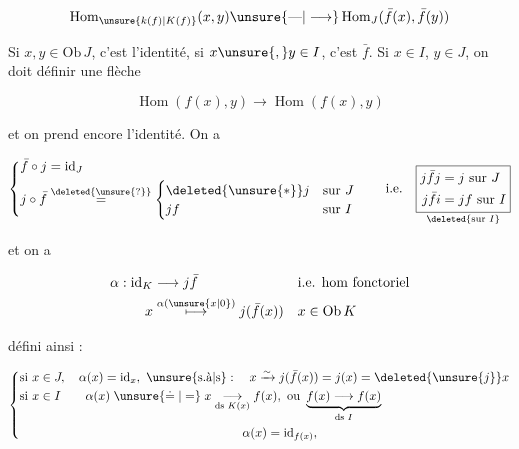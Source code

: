 \[
\operatorname{Hom}_{\unsure{k(f)|K(f)}}(x,y)\unsure{\text{---}|\longrightarrow}
\operatorname{Hom}_J(\bar f(x),\bar f(y))
\]

Si $x,y\in\mathrm{Ob}\,J$, c'est l'identité, si $x\unsure{,}y\in I$, c'est $\bar f$. Si $x\in I$, $y\in J$, on doit définir une flèche

\[
\operatorname{Hom}(f(x),y)\longrightarrow\operatorname{Hom}(f(x),y)
\]

et on prend encore l'identité.  On a


\[
\left\{\begin{aligned}
\bar f\circ j&=\mathrm{id}_J\\
j\circ\bar f&\overset{\deleted{\unsure{?}}}{=}
\begin{cases}\deleted{\unsure{*}}j&\text{sur }J\\jf&\text{sur }I\end{cases}
\end{aligned}\right.
\qquad\text{i.e.}\quad
\underset{\deleted{\text{sur }I}}{\boxed{\begin{aligned}
j\bar f j&=j\ \text{sur }J\\
j\bar f i&=jf\ \text{sur }I
\end{aligned}}}
\]

et on a 

\[
\begin{aligned}
\alpha:\mathrm{id}_K&\longrightarrow j\bar f&&\text{i.e. hom fonctoriel}\\
x&\overset{\alpha(\unsure{x|0})}{\longmapsto}j(\bar f(x))&&x\in\mathrm{Ob}\,K
\end{aligned}
\]

défini ainsi :

\[
\left\{\begin{aligned}
&\text{si }x\in J,\quad\alpha(x)=\mathrm{id}_x,\ \text{\unsure{s.à|s}}:\quad
 x\xrightarrow{\sim}j(\bar f(x))=j(x)=\deleted{\unsure{j}}x\\
&\text{si }x\in I\qquad\alpha(x)\mathrel{\unsure{\doteq|=}} x\underset{\text{ds }K(x)}{\longrightarrow}f(x),\ \text{ou }
 \underbrace{f(x)\longrightarrow f(x)}_{\text{ds }I}\\
&\hspace{18em}\alpha(x)=\mathrm{id}_{f(x)},
\end{aligned}\right.
\]

